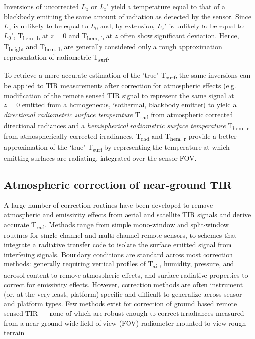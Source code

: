 \begin{bibunit}
Inversions of uncorrected $ L_z $ or \textbf{$L_z'$} yield a temperature equal to that of a blackbody emitting the same amount of radiation as detected by the sensor. Since $ L_z $ is unlikely to be equal to $ L_0 $ and, by extension,  $L_z'$ is unlikely to be equal to $L_0'$, T\textsubscript{hem, b} at $ z = 0 $ and T\textsubscript{hem, b} at $ z $ often show significant deviation. Hence, T\textsubscript{bright} and T\textsubscript{hem, b} are generally considered only a rough approximation representation of radiometric T\textsubscript{surf}.

To retrieve a more accurate estimation of the 'true' T\textsubscript{surf}, the same inversions can be applied to TIR measurements after correction for atmospheric effects (e.g. modification of the remote sensed TIR signal to represent the same signal at $ z = 0 $ emitted from a homogeneous, isothermal, blackbody emitter) to yield a \textit{directional radiometric surface temperature} T\textsubscript{rad} from atmospheric corrected directional radiances and a \textit{hemispherical radiometric surface temperature} T\textsubscript{hem, r} from atmospherically corrected irradiances. T\textsubscript{rad} and T\textsubscript{hem, r} provide a better approximation of the ‘true’ T\textsubscript{surf} by representing the temperature at which emitting surfaces are radiating, integrated over the sensor FOV.


\subsection{Atmospheric correction of near-ground TIR} \label{Atmospheric correction of near-ground TIR}

A large number of correction routines have been developed to remove atmospheric and emissivity effects from aerial and satellite TIR signals and derive accurate T\textsubscript{rad}. Methods range from simple mono-window \citep{Qin2001} and split-window \citep{Wan1996} routines for single-channel and multi-channel remote sensors, to schemes that integrate a radiative transfer code to isolate the surface emitted signal from interfering signals. Boundary conditions are standard across most correction methods: generally requiring vertical profiles of T\textsubscript{air}, humidity, pressure, and aerosol content to remove atmospheric effects, and surface radiative properties to correct for emissivity effects. However, correction methods are often instrument (or, at the very least, platform) specific and difficult to generalize across sensor and platform types. Few methods exist for correction of ground based remote sensed TIR --- none of which are robust enough to correct irradiances measured from a near-ground wide-field-of-view (FOV) radiometer mounted to view rough terrain. 


\end{bibunit}
